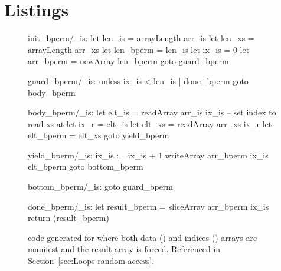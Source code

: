 \documentclass[preamble.tex]{subfiles}
\begin{document}
\clearpage

\chapter{Listings}
\label{ch:listings}

\begin{figure}[ht!]
\begin{loopcode}[%
    literate=
        {_xs}{{\sub{xs}}}2
        {_r}{{\sub{r}}}1
        {_is}{{\sub{is}}}2
        {_bperm}{{\sub{bperm}}}5
]
init_bperm/_is:
  let len_is = arrayLength arr_is
  let len_xs = arrayLength arr_xs
  let len_bperm = len_is
  let ix_is = 0
  let arr_bperm = newArray len_bperm
  goto guard_bperm

guard_bperm/_is:
  unless ix_is < len_is | done_bperm
  goto body_bperm

body_bperm/_is:
  let elt_is = readArray arr_is ix_is
  -- set index to read xs at
  let ix_r = elt_is
  let elt_xs = readArray arr_xs ix_r
  let elt_bperm = elt_xs
  goto yield_bperm

yield_bperm/_is:
  ix_is := ix_is + 1
  writeArray arr_bperm ix_is elt_bperm
  goto bottom_bperm

bottom_bperm/_is:
  goto guard_bperm

done_bperm/_is:
  let result_bperm = sliceArray arr_bperm ix_is
  return (result_bperm)
\end{loopcode}

\caption{\Loop code generated for  where both data () and indices () arrays are manifest and the result array is forced. Referenced in Section~\protect\ref{sec:Loops-random-access}.}
\label{fig:Loop-bpermute-complete}
\end{figure}
\end{document}
